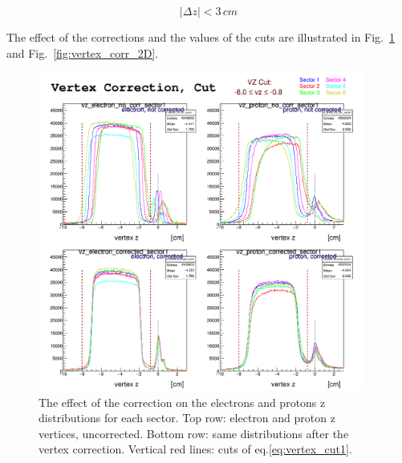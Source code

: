 \begin{equation}
    \left| \Delta z \right| < 3 \,cm
    \label{eq:vertex_cut2}
\end{equation}

The effect of the corrections and the values of the cuts are illustrated in
Fig.~\ref{fig:vertex_corr} and Fig.~\ref{fig:vertex_corr_2D}.

\begin{figure}[h]
    \centering
    \includegraphics[width=0.96\textwidth ]{img/vtx_all_sector}
    \caption{The effect of the correction on the electrons and protons z
    distributions for each sector. Top row: electron and proton
    z vertices, uncorrected. Bottom row: same distributions after
    the vertex correction. Vertical red lines: cuts of eq.\ref{eq:vertex_cut1}. }
    \label{fig:vertex_corr}
\end{figure}

